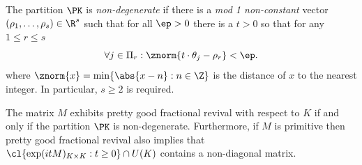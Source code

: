 \begin{defi}\label{def:non-deg}
The partition $\PK$ is \emph{non-degenerate} if there is a \emph{mod 1 non-constant} vector $(\rho_1, \dots, \rho_s) \in \R^s$ such that for all $\ep > 0$ there is a $t > 0$ so that for any $1 \leq r \leq s$ 
\begin{equation}\label{eq:approximate} \forall j \in \Pi_r : \znorm{ t \cdot \theta_j - \rho_r} < \ep.\end{equation}
where $\znorm{x} = \min\{\abs{x-n} : n \in \Z\}$ is the distance of $x$ to the nearest integer. In particular, $s \geq 2$ is required.

\end{defi}

\begin{theorem}\label{thm:pgfr_pk}
The matrix $M$ exhibits pretty good fractional revival with respect to $K$ if and only if the partition $\PK$ is non-degenerate. Furthermore, if $M$ is primitive then pretty good fractional revival also implies that $\cl \{ \exp(i t M)_{K \times K} : t \geq 0\} \cap U(K)$ contains a non-diagonal matrix.
\end{theorem}

